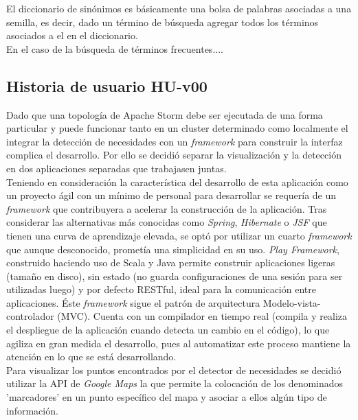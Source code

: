 El diccionario de sinónimos es básicamente una bolsa de palabras asociadas a una semilla, es decir, dado un término de búsqueda agregar todos los términos asociados a el en el diccionario.\\

En el caso de la búsqueda de términos frecuentes....

\subsection{Historia de usuario HU-v00}
\label{subsec:HU-v00}

Dado que una topología de Apache Storm debe ser ejecutada de una forma particular y puede funcionar tanto en un cluster determinado como localmente el integrar la detección de necesidades con un \textit{framework} para construir la interfaz complica el desarrollo. Por ello se decidió separar la visualización y la detección en dos aplicaciones separadas que trabajasen juntas.\\

Teniendo en consideración la característica del desarrollo de esta aplicación como un proyecto ágil con un mínimo de personal para desarrollar se requería de un \textit{framework} que contribuyera a acelerar la construcción de la aplicación. Tras considerar las alternativas más conocidas como \textit{Spring}, \textit{Hibernate} o \textit{JSF} que tienen una curva de aprendizaje elevada, se optó por utilizar un cuarto \textit{framework} que aunque desconocido, prometía una simplicidad en su uso. \textit{Play Framework}, construido haciendo uso de Scala y Java permite construir aplicaciones ligeras (tamaño en disco), sin estado (no guarda configuraciones de una sesión para ser utilizadas luego) y por defecto RESTful, ideal para la comunicación entre aplicaciones. Éste \textit{framework} sigue el patrón de arquitectura Modelo-vista-controlador (MVC). Cuenta con un compilador en tiempo real (compila y realiza el despliegue de la aplicación cuando detecta un cambio en el código), lo que agiliza en gran medida el desarrollo, pues al automatizar este proceso mantiene la atención en lo que se está desarrollando.\\

Para visualizar los puntos encontrados por el detector de necesidades se decidió utilizar la API de \textit{Google Maps} la que permite la colocación de los denominados 'marcadores' en un punto específico del mapa y asociar a ellos algún tipo de información.\\

